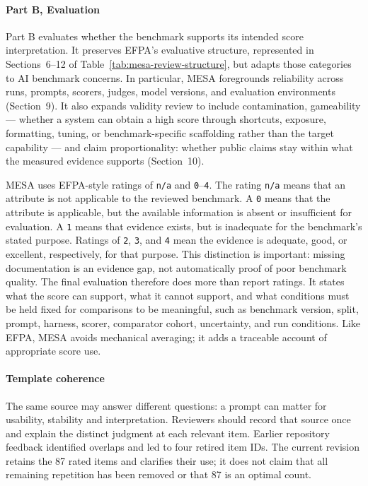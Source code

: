 \documentclass[conference]{IEEEtran}
\begin{document}
    \paragraph{Part B, Evaluation}
    Part B evaluates whether the benchmark supports its intended score interpretation. It preserves EFPA's evaluative structure, represented in Sections~6--12 of Table~\ref{tab:mesa-review-structure}, but adapts those categories to AI benchmark concerns. In particular, MESA foregrounds reliability across runs, prompts, scorers, judges, model versions, and evaluation environments (Section~9). It also expands validity review to include contamination, gameability --- whether a system can obtain a high score through shortcuts, exposure, formatting, tuning, or benchmark-specific scaffolding rather than the target capability --- and claim proportionality: whether public claims stay within what the measured evidence supports (Section~10).
    
    MESA uses EFPA-style ratings of \texttt{n/a} and \texttt{0}--\texttt{4}. The rating \texttt{n/a} means that an attribute is not applicable to the reviewed benchmark. A \texttt{0} means that the attribute is applicable, but the available information is absent or insufficient for evaluation. A \texttt{1} means that evidence exists, but is inadequate for the benchmark's stated purpose. Ratings of \texttt{2}, \texttt{3}, and \texttt{4} mean the evidence is adequate, good, or excellent, respectively, for that purpose. This distinction is important: missing documentation is an evidence gap, not automatically proof of poor benchmark quality. The final evaluation therefore does more than report ratings. It states what the score can support, what it cannot support, and what conditions must be held fixed for comparisons to be meaningful, such as benchmark version, split, prompt, harness, scorer, comparator cohort, uncertainty, and run conditions. Like EFPA, MESA avoids mechanical averaging; it adds a traceable account of appropriate score use.
    
    \paragraph{Template coherence}
    The same source may answer different questions: a prompt can matter for usability, stability and interpretation. Reviewers should record that source once and explain the distinct judgment at each relevant item. Earlier repository feedback identified overlaps and led to four retired item IDs. The current revision retains the 87 rated items and clarifies their use; it does not claim that all remaining repetition has been removed or that 87 is an optimal count.
    
\end{document}
